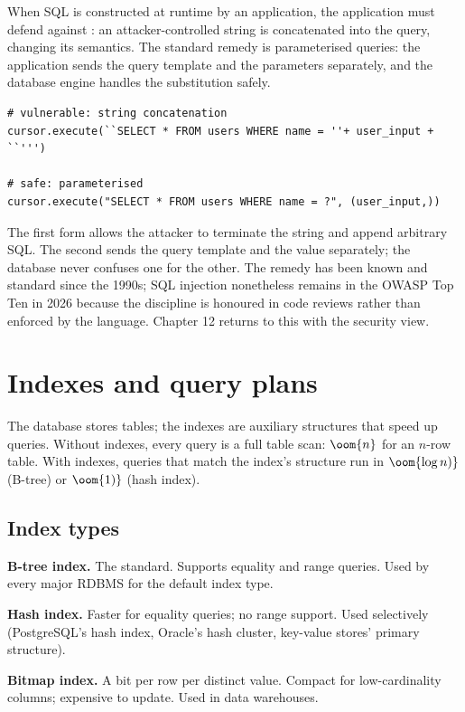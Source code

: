 When SQL is constructed at runtime by an application, the application must defend against : an attacker-controlled string is concatenated into the query, changing its semantics. The standard remedy is parameterised queries: the application sends the query template and the parameters separately, and the database engine handles the substitution safely.

\begin{verbatim}
# vulnerable: string concatenation
cursor.execute(``SELECT * FROM users WHERE name = ''+ user_input + ``''')

# safe: parameterised
cursor.execute("SELECT * FROM users WHERE name = ?", (user_input,))
\end{verbatim}

The first form allows the attacker to terminate the string and append arbitrary SQL. The second sends the query template and the value separately; the database never confuses one for the other. The remedy has been known and standard since the 1990s; SQL injection nonetheless remains in the OWASP Top Ten in 2026 because the discipline is honoured in code reviews rather than enforced by the language. Chapter 12 returns to this with the security view.

\section{Indexes and query plans}

The database stores tables; the indexes are auxiliary structures that speed up queries. Without indexes, every query is a full table scan: $\oom{n}$ for an $n$-row table. With indexes, queries that match the index's structure run in $\oom{\log n)}$ (B-tree) or $\oom{1)}$ (hash index).

\subsection{Index types}

\textbf{B-tree index.} The standard. Supports equality and range queries. Used by every major RDBMS for the default index type.

\textbf{Hash index.} Faster for equality queries; no range support. Used selectively (PostgreSQL's hash index, Oracle's hash cluster, key-value stores' primary structure).

\textbf{Bitmap index.} A bit per row per distinct value. Compact for low-cardinality columns; expensive to update. Used in data warehouses.

